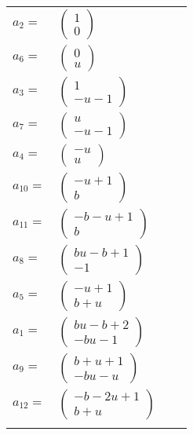 \documentclass[1p]{elsarticle_modified}
\theoremstyle{definition}
\begin{document}
\begin{tabular}{m{7pt} m{180pt} m{7pt} m{180pt} }
\flushright $a_{2}=$&$\begin{pmatrix}1\\0\end{pmatrix}$ \\
\flushright $a_{6}=$&$\begin{pmatrix}0\\u\end{pmatrix}$ \\
\flushright $a_{3}=$&$\begin{pmatrix}1\\- u-1\end{pmatrix}$ \\
\flushright $a_{7}=$&$\begin{pmatrix}u\\- u-1\end{pmatrix}$ \\
\flushright $a_{4}=$&$\begin{pmatrix}- u\\u\end{pmatrix}$ \\
\flushright $a_{10}=$&$\begin{pmatrix}- u+1\\b\end{pmatrix}$ \\
\flushright $a_{11}=$&$\begin{pmatrix}- b- u+1\\b\end{pmatrix}$ \\
\flushright $a_{8}=$&$\begin{pmatrix}b u- b+1\\-1\end{pmatrix}$ \\
\flushright $a_{5}=$&$\begin{pmatrix}- u+1\\b+u\end{pmatrix}$ \\
\flushright $a_{1}=$&$\begin{pmatrix}b u- b+2\\- b u-1\end{pmatrix}$ \\
\flushright $a_{9}=$&$\begin{pmatrix}b+u+1\\- b u- u\end{pmatrix}$ \\
\flushright $a_{12}=$&$\begin{pmatrix}- b-2 u+1\\b+u\end{pmatrix}$\\&\end{tabular}
\end{document}
